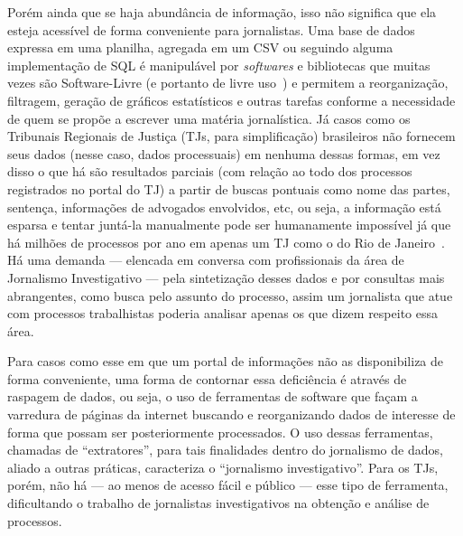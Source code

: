 Porém ainda que se haja abundância de informação, isso não significa que ela
esteja acessível de forma conveniente para jornalistas. Uma base de dados
expressa em uma planilha, agregada em um CSV ou seguindo alguma implementação
de SQL é manipulável por \textit{softwares} e bibliotecas que muitas vezes são
Software-Livre (e portanto de livre uso~\cite{def:free-software}) e permitem a
reorganização, filtragem, geração de gráficos estatísticos e outras tarefas
conforme a necessidade de quem se propõe a escrever uma matéria jornalística.
Já casos como os Tribunais Regionais de Justiça (TJs, para simplificação)
brasileiros não fornecem seus dados (nesse caso, dados processuais) em nenhuma
dessas formas, em vez disso o que há são resultados parciais (com relação ao
todo dos processos registrados no portal do TJ) a partir de buscas pontuais
como nome das partes, sentença, informações de advogados envolvidos, etc, ou
seja, a informação está esparsa e tentar juntá-la manualmente pode ser
humanamente impossível já que há milhões de processos por ano em apenas um TJ
como o do Rio de Janeiro~\cite{tjrj}. Há uma demanda --- elencada em conversa
com profissionais da área de Jornalismo Investigativo --- pela sintetização
desses dados e por consultas mais abrangentes, como busca pelo assunto do
processo, assim um jornalista que atue com processos trabalhistas poderia
analisar apenas os que dizem respeito essa área.

Para casos como esse em que um portal de informações não as disponibiliza de
forma conveniente, uma forma de contornar essa deficiência é através de
raspagem de dados, ou seja, o uso de ferramentas de software que façam a
varredura de páginas da internet buscando e reorganizando dados de interesse de
forma que possam ser posteriormente processados. O uso dessas ferramentas,
chamadas de ``extratores'', para tais finalidades dentro do jornalismo de
dados, aliado a outras práticas, caracteriza o ``jornalismo investigativo''.
Para os TJs, porém, não há --- ao menos de acesso fácil e público --- esse tipo
de ferramenta, dificultando o trabalho de jornalistas investigativos na
obtenção e análise de processos.

